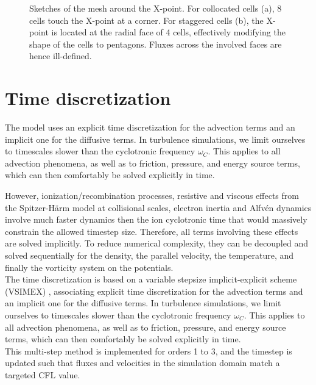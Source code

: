 \begin{figure}[H]
\begin{subfigure}[t]{0.39\textwidth}
		\label{fig:StaggeredXpoint}
	\end{subfigure}
	\caption{ Sketches of the mesh around the X-point. For collocated cells (a), 8 cells touch the X-point at a corner. For staggered cells (b), the X-point is located at the radial face of 4 cells, effectively modifying the shape of the cells to pentagons. Fluxes across the involved faces are hence ill-defined. }
	\label{fig:XpointDiscretization}
\end{figure}





\section{Time discretization}

The model uses an explicit time discretization for the advection terms and an implicit one for the diffusive terms. In turbulence simulations, we limit ourselves to timescales slower than the cyclotronic frequency $\omega_C$. This applies to all advection phenomena, as well as to friction, pressure, and energy source terms, which can then comfortably be solved explicitly in time. \newline

However, ionization/recombination processes, resistive and viscous effects from the Spitzer-Härm model at collisional scales, electron inertia and Alfvén dynamics involve much faster dynamics then the ion cyclotronic time that would massively constrain the allowed timestep size. Therefore, all terms involving these effects are solved implicitly. To reduce numerical complexity, they can be decoupled and solved sequentially for the density, the parallel velocity, the temperature, and finally the vorticity system on the potentials. \\

The time discretization is based on a variable stepsize implicit-explicit scheme (VSIMEX) \cite{wang2008variable}, associating explicit time discretization for the advection terms and an implicit one for the diffusive terms. In turbulence simulations, we limit ourselves to timescales slower than the cyclotronic frequency $\omega_C$. This applies to all advection phenomena, as well as to friction, pressure, and energy source terms, which can then comfortably be solved explicitly in time. \\

This multi-step method is implemented for orders 1 to 3, and the timestep is updated such that fluxes and velocities in the simulation domain match a targeted CFL value. \newline







